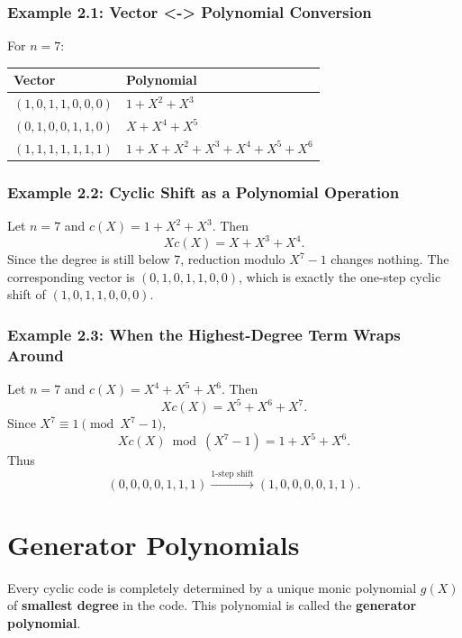 \documentclass[11pt,oneside]{book}
\theoremstyle{plain}
\theoremstyle{definition}
\theoremstyle{remark}
\begin{document}
\subsubsection{Example 2.1: Vector \textless-\textgreater{} Polynomial
Conversion}\label{example-2.1-vector---polynomial-conversion}

For \(n=7\):

\begin{longtable}[]{@{}ll@{}}
\toprule\noalign{}
Vector & Polynomial \\
\midrule\noalign{}
\endhead
\bottomrule\noalign{}
\endlastfoot
\((1,0,1,1,0,0,0)\) & \(1+X^2+X^3\) \\
\((0,1,0,0,1,1,0)\) & \(X+X^4+X^5\) \\
\((1,1,1,1,1,1,1)\) & \(1+X+X^2+X^3+X^4+X^5+X^6\) \\
\end{longtable}

\subsubsection{Example 2.2: Cyclic Shift as a Polynomial
Operation}\label{example-2.2-cyclic-shift-as-a-polynomial-operation}

Let \(n=7\) and \(c(X)=1+X^2+X^3\). Then \[Xc(X)=X+X^3+X^4.\] Since the
degree is still below 7, reduction modulo \(X^7-1\) changes nothing. The
corresponding vector is \((0,1,0,1,1,0,0)\), which is exactly the
one-step cyclic shift of \((1,0,1,1,0,0,0)\).

\subsubsection{Example 2.3: When the Highest-Degree Term Wraps
Around}\label{example-2.3-when-the-highest-degree-term-wraps-around}

Let \(n=7\) and \(c(X)=X^4+X^5+X^6\). Then \[Xc(X)=X^5+X^6+X^7.\] Since
\(X^7 \equiv 1 \pmod{X^7-1}\), \[Xc(X) \bmod (X^7-1)=1+X^5+X^6.\] Thus
\[(0,0,0,0,1,1,1) \xrightarrow{\text{1-step shift}} (1,0,0,0,0,1,1).\]


\section{Generator Polynomials}\label{sec:generator-polynomials}

Every cyclic code is completely determined by a unique monic polynomial
\(g(X)\) of \textbf{smallest degree} in the code. This polynomial is
called the \textbf{generator polynomial}.
\end{document}
